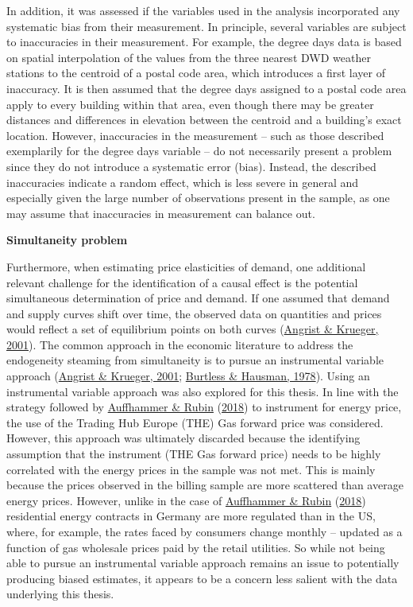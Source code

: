 \documentclass[12pt,twoside]{reedthesis}
\begin{document}
In addition, it was assessed if the variables used in the analysis incorporated any systematic bias from their measurement. In principle, several variables are subject to inaccuracies in their measurement. For example, the degree days data is based on spatial interpolation of the values from the three nearest DWD weather stations to the centroid of a postal code area, which introduces a first layer of inaccuracy. It is then assumed that the degree days assigned to a postal code area apply to every building within that area, even though there may be greater distances and differences in elevation between the centroid and a building's exact location. However, inaccuracies in the measurement -- such as those described exemplarily for the degree days variable -- do not necessarily present a problem since they do not introduce a systematic error (bias). Instead, the described inaccuracies indicate a random effect, which is less severe in general and especially given the large number of observations present in the sample, as one may assume that inaccuracies in measurement can balance out.

\textbf{Simultaneity problem}

Furthermore, when estimating price elasticities of demand, one additional relevant challenge for the identification of a causal effect is the potential simultaneous determination of price and demand. If one assumed that demand and supply curves shift over time, the observed data on quantities and prices would reflect a set of equilibrium points on both curves (\protect\hyperlink{ref-angrist_krueger01}{Angrist \& Krueger, 2001}). The common approach in the economic literature to address the endogeneity steaming from simultaneity is to pursue an instrumental variable approach (\protect\hyperlink{ref-angrist_krueger01}{Angrist \& Krueger, 2001}; \protect\hyperlink{ref-burtless_hausman78}{Burtless \& Hausman, 1978}). Using an instrumental variable approach was also explored for this thesis. In line with the strategy followed by \protect\hyperlink{ref-auffhammer_rubin18}{Auffhammer \& Rubin} (\protect\hyperlink{ref-auffhammer_rubin18}{2018}) to instrument for energy price, the use of the Trading Hub Europe (THE) Gas forward price was considered. However, this approach was ultimately discarded because the identifying assumption that the instrument (THE Gas forward price) needs to be highly correlated with the energy prices in the sample was not met. This is mainly because the prices observed in the billing sample are more scattered than average energy prices. However, unlike in the case of \protect\hyperlink{ref-auffhammer_rubin18}{Auffhammer \& Rubin} (\protect\hyperlink{ref-auffhammer_rubin18}{2018}) residential energy contracts in Germany are more regulated than in the US, where, for example, the rates faced by consumers change monthly -- updated as a function of gas wholesale prices paid by the retail utilities. So while not being able to pursue an instrumental variable approach remains an issue to potentially producing biased estimates, it appears to be a concern less salient with the data underlying this thesis.
\end{document}
